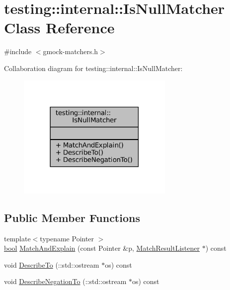 \hypertarget{classtesting_1_1internal_1_1IsNullMatcher}{}\section{testing\+:\+:internal\+:\+:Is\+Null\+Matcher Class Reference}
\label{classtesting_1_1internal_1_1IsNullMatcher}


{\ttfamily \#include $<$gmock-\/matchers.\+h$>$}



Collaboration diagram for testing\+:\+:internal\+:\+:Is\+Null\+Matcher\+:
\nopagebreak
\begin{figure}[H]
\begin{center}
\leavevmode
\includegraphics[width=213pt]{classtesting_1_1internal_1_1IsNullMatcher__coll__graph}
\end{center}
\end{figure}
\subsection*{Public Member Functions}
\begin{DoxyCompactItemize}
\item 
{\footnotesize template$<$typename Pointer $>$ }\\\hyperlink{classbool}{bool} \hyperlink{classtesting_1_1internal_1_1IsNullMatcher_ab8a96a4389c9c352e367ba2edff6e87d}{Match\+And\+Explain} (const Pointer \&p, \hyperlink{classtesting_1_1MatchResultListener}{Match\+Result\+Listener} $\ast$) const
\item 
void \hyperlink{classtesting_1_1internal_1_1IsNullMatcher_a81c0b31d64bc65b5573bb56bbc3f4af8}{Describe\+To} (\+::std\+::ostream $\ast$os) const
\item 
void \hyperlink{classtesting_1_1internal_1_1IsNullMatcher_a8349e2d6cef08303be7f2471f330a7c0}{Describe\+Negation\+To} (\+::std\+::ostream $\ast$os) const
\end{DoxyCompactItemize}



